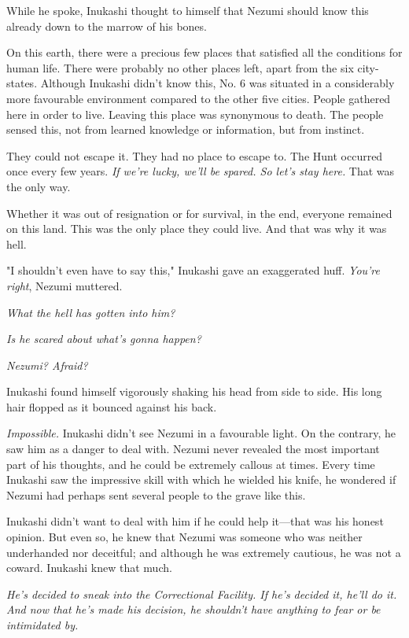 While he spoke, Inukashi thought to himself that Nezumi should know this
already down to the marrow of his bones.

On this earth, there were a precious few places that satisfied all the
conditions for human life. There were probably no other places left,
apart from the six city-states. Although Inukashi didn't know this, No.
6 was situated in a considerably more favourable environment compared to
the other five cities. People gathered here in order to live. Leaving
this place was synonymous to death. The people sensed this, not from
learned knowledge or information, but from instinct.

They could not escape it. They had no place to escape to. The Hunt
occurred once every few years. \emph{If we're lucky, we'll be spared. So let's
stay here.} That was the only way.

Whether it was out of resignation or for survival, in the end, everyone
remained on this land. This was the only place they could live. And that
was why it was hell.

"I shouldn't even have to say this," Inukashi gave an exaggerated huff.
\emph{You're right}, Nezumi muttered.

\emph{What the hell has gotten into him?}

\emph{Is he scared about what's gonna happen?}

\emph{Nezumi? Afraid?}

Inukashi found himself vigorously shaking his head from side to side.
His long hair flopped as it bounced against his back.

\emph{Impossible.} Inukashi didn't see Nezumi in a favourable light. On the
contrary, he saw him as a danger to deal with. Nezumi never revealed the
most important part of his thoughts, and he could be extremely callous
at times. Every time Inukashi saw the impressive skill with which he
wielded his knife, he wondered if Nezumi had perhaps sent several people
to the grave like this.

Inukashi didn't want to deal with him if he could help it---that was his
honest opinion. But even so, he knew that Nezumi was someone who was
neither underhanded nor deceitful; and although he was extremely
cautious, he was not a coward. Inukashi knew that much.

\emph{He's decided to sneak into the Correctional Facility. If he's decided
it, he'll do it. And now that he's made his decision, he shouldn't have
anything to fear or be intimidated by.}

